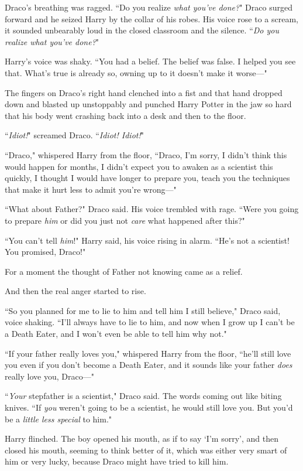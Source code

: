 Draco's breathing was ragged. ``Do you realize \emph{what you've done?}" Draco surged forward and he seized Harry by the collar of his robes. His voice rose to a scream, it sounded unbearably loud in the closed classroom and the silence. ``\emph{Do you realize what you've done?}"

Harry's voice was shaky. ``You had a belief. The belief was false. I helped you see that. What's true is already so, owning up to it doesn't make it worse—"

The fingers on Draco's right hand clenched into a fist and that hand dropped down and blasted up unstoppably and punched Harry Potter in the jaw so hard that his body went crashing back into a desk and then to the floor.

``\emph{Idiot!}" screamed Draco. ``\emph{Idiot! Idiot!}"

``Draco," whispered Harry from the floor, ``Draco, I'm sorry, I didn't think this would happen for months, I didn't expect you to awaken as a scientist this quickly, I thought I would have longer to prepare you, teach you the techniques that make it hurt less to admit you're wrong—"

``What about Father?" Draco said. His voice trembled with rage. ``Were you going to prepare \emph{him} or did you just not \emph{care} what happened after this?"

``You can't tell \emph{him}!" Harry said, his voice rising in alarm. ``He's not a scientist! You promised, Draco!"

For a moment the thought of Father not knowing came as a relief.

And then the real anger started to rise.

``So you planned for me to lie to him and tell him I still believe," Draco said, voice shaking. ``I'll always have to lie to him, and now when I grow up I can't be a Death Eater, and I won't even be able to tell him why not."

``If your father really loves you," whispered Harry from the floor, ``he'll still love you even if you don't become a Death Eater, and it sounds like your father \emph{does} really love you, Draco—"

``\emph{Your} stepfather is a scientist," Draco said. The words coming out like biting knives. ``If \emph{you} weren't going to be a scientist, he would still love you. But you'd be a \emph{little less special} to him."

Harry flinched. The boy opened his mouth, as if to say `I'm sorry', and then closed his mouth, seeming to think better of it, which was either very smart of him or very lucky, because Draco might have tried to kill him.

